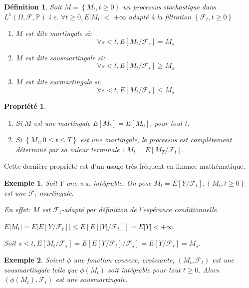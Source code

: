 \documentclass[A4paper,12pt]{report}
\newtheorem{definition}{D\'efinition}[chapter]
\newtheorem{example}{Exemple}[chapter]
\newtheorem{propr}{ Propriété}[chapter]
\newcommand{\pr}{{\mathbb{P}}}
\begin{document}
\begin{definition} 
 Soit $M=\left\{M_{t}, t \geq 0\right\}$ un processus stochastique dans $L^{1}(\Omega, \mathcal{F}, \pr )$ i.e. $\forall t \geq 0, E\left|M_{t}\right|<$ $+\infty$ adapté à la filtration $\left\{\mathcal{F}_{t}, t \geq 0\right\}$
\begin{enumerate}
\item $M$ est dite martingale si: $$\forall  s<t, E\left[M_{t} / \mathcal{F}_{s}\right]=M_{s}$$

\item $M$ est dite sousmartingale si:  $$ \forall s<t, E\left[M_{t} / \mathcal{F}_{s}\right] \geq M_{s}$$

\item $M$ est dite surmartingale si: $$ \forall s<t, E\left[M_{t} / \mathcal{F}_{s}\right] \leq M_{s}$$
\end{enumerate}

\end{definition} 
\begin{propr}
\begin{enumerate}
     \item Si $M$ est une martingale $E\left[M_{t}\right]=E\left[M_{0}\right]$, pour tout $t$.

     \item Si $\left\{M_{t}, 0 \leq t \leq T\right\}$ est une martingale, le processus est complètement déterminé par sa valeur terminale : $M_{t}=E\left[M_{T} / \mathcal{F}_{t}\right]$.
\end{enumerate}
\end{propr}
Cette dernière propriété est d'un usage très fréquent en finance mathématique.

\begin{example}
 Soit $Y$ une v.a. intégrable. On pose $M_{t}=E\left[Y / \mathcal{F}_{t}\right],\left\{M_{t}, t \geq 0\right\}$ est une $\mathcal{F}_{t}$-martingale.

En effet: $M$ est $\mathcal{F}_{t}$-adapté par définition de l'espérance conditionnelle.

$E\left|M_{t}\right|=E\left|E\left[Y / \mathcal{F}_{t}\right]\right| \leq E\left[E\left[|Y| / \mathcal{F}_{t}\right]\right]=E|Y|<+\infty$

Soit $s<t, E\left[M_{t} / \mathcal{F}_{s}\right]=E\left[E\left[Y / \mathcal{F}_{t}\right] / \mathcal{F}_{s}\right]=E\left[Y / \mathcal{F}_{s}\right]=M_{s}$.\\
\end{example}
\begin{example}
 Soient $\phi$ une fonction convexe, croissante, $\left(M_{t}, \mathcal{F}_{t}\right)$ est une sousmartingale telle que $\phi\left(M_{t}\right)$ soit intégrable pour tout $t \geq 0$. Alors $\left(\phi\left(M_{t}\right), \mathcal{F}_{t}\right)$ est une sousmartingale.
\end{example}
\end{document}
